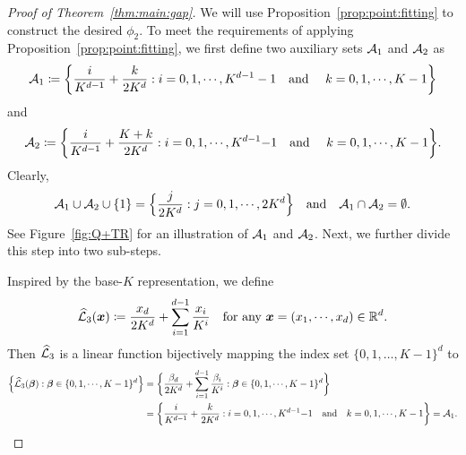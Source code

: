 \documentclass[nohyperref]{article}
\theoremstyle{plain}
\theoremstyle{definition}
\theoremstyle{remark}
\begin{document}
\begin{proof}[Proof of Theorem~\ref{thm:main:gap}]

We will use Proposition~\ref{prop:point:fitting} to construct the desired $\phi_2$.
To meet the requirements of applying Proposition~\ref{prop:point:fitting}, we first define two auxiliary sets ${\mathcal{A}}_1$ and ${\mathcal{A}}_2$ as 
\begin{equation*}
	\calA_1\coloneqq \bigg\{\frac{i}{K^{d-1}}+\frac{k}{2K^d}:i=0,1,\dotsc,K^{d-1}-1\tn{\quad and \quad} k=0,1,\dotsc,K-1\bigg\}
\end{equation*}
and 
\begin{equation*}
	\calA_2\coloneqq \bigg\{\frac{i}{K^{d-1}}+\frac{K+k}{2K^d}:i=0,1,\dotsc,K^{d-1}\black{-1}\tn{\quad and \quad}k=0,1,\dotsc,K-1\bigg\}.
\end{equation*}
Clearly, 
\begin{equation*}
	\calA_1\cup\calA_2\cup\{1\}=\Big\{\frac{j}{2K^d}:j=0,1,\dotsc,2K^d\Big\}
	\quad \tn{and}\quad \calA_1\cap\calA_2=\emptyset.
\end{equation*} 
See Figure~\ref{fig:Q+TR} for an illustration of ${\mathcal{A}}_1$ and ${\mathcal{A}}_2$. Next, we further divide this step into two sub-steps.


Inspired by the base-$K$ representation, we define
\begin{equation}
	\hatcalL_3(\bmx)\coloneqq \frac{x_d}{2K^d}+\sum_{i=1}^{d-1}\frac{x_i}{K^i}\quad \tn{for any $\bmx=(x_1,\dotsc,x_d)\in \R^d$.}
\end{equation}
Then ${\mathcal{\widehat{L}}}_3$ is a linear function bijectively mapping the index set $\{0,1,\dotsc,K-1\}^d$ to
\begin{equation*}
	\begin{split}
	 \Big\{\hatcalL_3(\bmbeta):\bm{\beta}\in \{0,1,\dotsc,K-1\}^d\Big\}
		& =\bigg\{\frac{\beta_d}{2K^d}+\sum_{i=1}^{d-1}\frac{\beta_i}{K^i}:\bm{\beta}\in \{0,1,\dotsc,K-1\}^d\bigg\}\\
		&=\bigg\{\frac{i}{K^{d-1}}+\frac{k}{2K^d}:i=0,1,\dotsc,K^{d-1}\black{-1}\tn{\quad and\quad } k=0,1,\dotsc,K-1\bigg\}=\calA_1.
	\end{split}
\end{equation*}




\end{proof}
\end{document}
